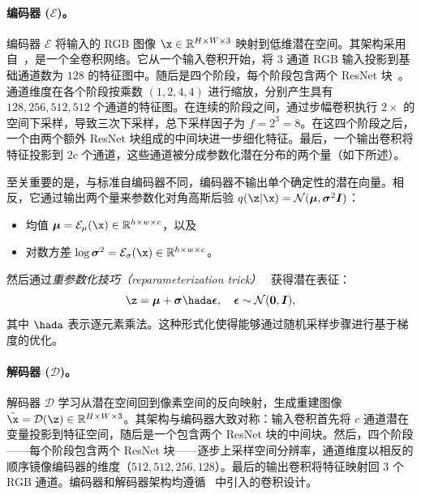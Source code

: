 \documentclass[../../book-main_zh.tex]{subfiles}
\begin{document}
\paragraph{编码器 ($\mathcal{E}$)。}
编码器 $\mathcal{E}$ 将输入的 RGB 图像 $\x \in \mathbb{R}^{H \times W \times 3}$ 映射到低维潜在空间。其架构采用自~\citep{esser2021taming}，是一个全卷积网络。它从一个输入卷积开始，将 3 通道 RGB 输入投影到基础通道数为 $128$ 的特征图中。随后是四个阶段，每个阶段包含两个 ResNet 块~\citep{he2016deep}。通道维度在各个阶段按乘数 $(1, 2, 4, 4)$ 进行缩放，分别产生具有 $128, 256, 512, 512$ 个通道的特征图。在连续的阶段之间，通过步幅卷积执行 $2\times$ 的空间下采样，导致三次下采样，总下采样因子为 $f = 2^3 = 8$。在这四个阶段之后，一个由两个额外 ResNet 块组成的中间块进一步细化特征。最后，一个输出卷积将特征投影到 $2c$ 个通道，这些通道被分成参数化潜在分布的两个量（如下所述）。

至关重要的是，与标准自编码器不同，编码器不输出单个确定性的潜在向量。相反，它通过输出两个量来参数化对角高斯后验 $q(\z | \x) = \mathcal{N}(\boldsymbol{\mu}, \boldsymbol{\sigma}^2 \boldsymbol{I})$：
\begin{itemize}
    \item 均值 $\boldsymbol{\mu} = \mathcal{E}_\mu(\x) \in \mathbb{R}^{h \times w \times c}$，以及
    \item 对数方差 $\log \boldsymbol{\sigma}^2 = \mathcal{E}_\sigma(\x) \in \mathbb{R}^{h \times w \times c}$。
\end{itemize}
然后通过\emph{重参数化技巧（reparameterization trick）}~\citep{kingma2013auto} 获得潜在表征：
\begin{equation}
    \z = \boldsymbol{\mu} + \boldsymbol{\sigma} \hada \boldsymbol{\epsilon}, \quad \boldsymbol{\epsilon} \sim \mathcal{N}(\boldsymbol{0}, \boldsymbol{I}),
\end{equation}
其中 $\hada$ 表示逐元素乘法。这种形式化使得能够通过随机采样步骤进行基于梯度的优化。

\paragraph{解码器 ($\mathcal{D}$)。}
解码器 $\mathcal{D}$ 学习从潜在空间回到像素空间的反向映射，生成重建图像 $\tilde{\x} = \mathcal{D}(\z) \in \mathbb{R}^{H \times W \times 3}$。其架构与编码器大致对称：输入卷积首先将 $c$ 通道潜在变量投影到特征空间，随后是一个包含两个 ResNet 块的中间块。然后，四个阶段——每个阶段包含两个 ResNet 块——逐步上采样空间分辨率，通道维度以相反的顺序镜像编码器的维度（$512, 512, 256, 128$）。最后的输出卷积将特征映射回 3 个 RGB 通道。编码器和解码器架构均遵循~\citep{esser2021taming} 中引入的卷积设计。
\end{document}
